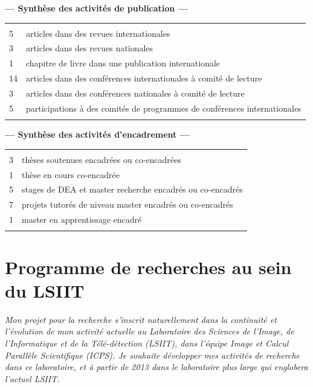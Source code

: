 \documentclass[11pt]{article}
\begin{document}
\begin{center}
	\textbf{--- Synthèse des activités de publication ---}\\[1mm]
\begin{tabular}{ll}
	\hline\\[-2mm]
	5	&	articles dans des revues internationales\\
	3	&	articles dans des revues nationales\\
	1	&	chapitre de livre dans une publication internationale\\
	14	& 	articles dans des conférences internationales à comité de lecture\\
	3	&	articles dans des conférences nationales à comité de lecture\\
	5	& 	participations à des comités de programmes de conférences internationales\\
	\hline\\
\end{tabular}


	\textbf{--- Synthèse des activités d'encadrement ---}\\[1mm]
\begin{tabular}{ll}
	\hline\\[-2mm]
	3	&	thèses soutenues encadrées ou co-encadrées\\
	1	& 	thèse en cours co-encadrée\\
	5	&	stages de DEA et master recherche encadrés ou co-encadrés\\
	7	& 	projets tutorés de niveau master encadrés ou co-encadrés\\
	1	& 	master en apprentissage encadré\\
	\hline\\
\end{tabular}

\end{center}


\section{Programme de recherches au sein du LSIIT}

\textit{%
Mon projet pour la recherche s'inscrit naturellement dans la continuité et 
l'évolution de mon activité actuelle au Laboratoire des Sciences de l'Image,
de l'Informatique et de la Télé-détection (LSIIT), dans l'équipe Image et
Calcul Parallèle Scientifique (ICPS). Je souhaite développer mes activités 
de recherche dans ce laboratoire, et à partir de  2013 dans le laboratoire 
plus large qui englobera l'actuel LSIIT.}\\
\end{document}
